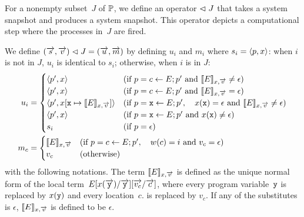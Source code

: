 For a nonempty subset~$J$ of $\mathbb{P}$, we define an operator $\vartriangleleft J$ that
takes a system snapshot and produces a system snapshot.
This operator depicts a computational step where the processes in~$J$
are fired.

We define $
(\overrightarrow s, \overrightarrow v) \vartriangleleft J = (\overrightarrow u, \overrightarrow m)
$ by defining
$u_i$ and $m_i$
where $s_i = \langle{p,x}\rangle$:
when $i$ is not in $J$, $u_i$ is identical to $s_i$; otherwise, when $i$
is in $J$:
\begin{align*}
 u_i & =
 \begin{cases}
 \langle{p',x}\rangle  & (\text{if } p = c
 \leftarrow E; p' \text{ and }\llbracket{E}\rrbracket_{x,\overrightarrow v} \neq \epsilon)
 \\
 \langle{p',x}\rangle  & (\text{if } p = c
 \leftarrow E; p' \text{ and }\llbracket{E}\rrbracket_{x,\overrightarrow v} = \epsilon)
 \\
 \langle{p', x[\texttt{x} \mapsto \llbracket{E}\rrbracket_{x, \overrightarrow v}]}\rangle&
                       (\text{if } p = \texttt{x} \leftarrow E; p', \quad
 x(\texttt{x}) = \epsilon  \text{ and } \llbracket{E}\rrbracket_{x, \overrightarrow v} \neq \epsilon) \\
 \langle{p', x}\rangle & (\text{if } p = \texttt{x} \leftarrow E; p' \text{
 and }
 x(\texttt{x}) \neq \epsilon) \\
 s_i & (\text{if } p = \epsilon)
 \end{cases}\\
 m_c & =
 \begin{cases}
 \llbracket{E}\rrbracket_{x, \overrightarrow v} & (\text{if } p = c \leftarrow E; p',\quad w(c)= i
  \text{
 and } v_c = \epsilon) \\
 v_c &(\text{otherwise})
 \end{cases}\\
\end{align*}
with the following notations.
The term
$\llbracket{E}\rrbracket_{x, \overrightarrow v}$ is defined as the unique normal form
of the local term~$E[x(\overrightarrow{\texttt{y}}) / \overrightarrow{\texttt{y}}][\overrightarrow{v_c}/\overrightarrow c]$, where
every program variable~$\texttt{y}$ is replaced by $x(\texttt{y})$
and every location~$c$. is replaced by $v_c$.
If any of the substitutes is $\epsilon$,
$\llbracket{E}\rrbracket_{x, \overrightarrow v}$ is defined to be $\epsilon$.

